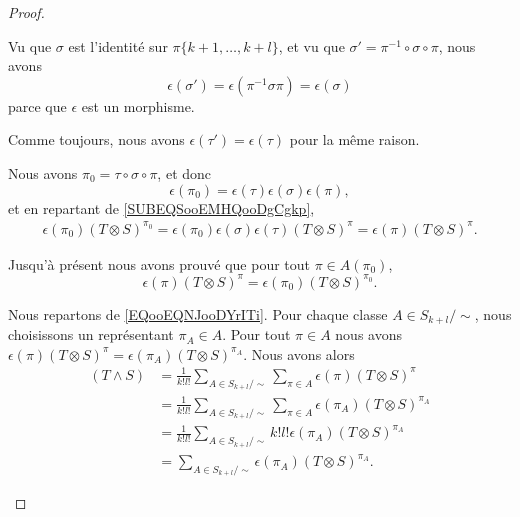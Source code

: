 \begin{proof}
\begin{subproof}
		\spitem[Signature]
		Vu que \( \sigma\) est l'identité sur \( \pi\{ k+1,\ldots,k+l \}\), et vu que \( \sigma'=\pi^{-1}\circ\sigma\circ\pi\), nous avons
		\begin{equation}
			\epsilon(\sigma')=\epsilon(\pi^{-1}\sigma\pi)=\epsilon(\sigma)
		\end{equation}
		parce que \( \epsilon\) est un morphisme.

		Comme toujours, nous avons \( \epsilon(\tau')=\epsilon(\tau)\) pour la même raison.

		Nous avons \( \pi_0=\tau\circ\sigma\circ\pi\), et donc
		\begin{equation}
			\epsilon(\pi_0)=\epsilon(\tau)\epsilon(\sigma)\epsilon(\pi),
		\end{equation}
		et en repartant de \eqref{SUBEQSooEMHQooDgCgkp},
		\begin{subequations}
			\begin{align}
				\epsilon(\pi_0)(T\otimes S)^{\pi_0}=\epsilon(\pi_0)\epsilon(\sigma)\epsilon(\tau)(T\otimes S)^{\pi}=\epsilon(\pi)(T\otimes S)^{\pi}.
			\end{align}
		\end{subequations}

		\spitem[Résumé]
		Jusqu'à présent nous avons prouvé que pour tout \( \pi\in A(\pi_0)\),
		\begin{equation}
			\epsilon(\pi)(T\otimes S)^{\pi}=\epsilon(\pi_0)(T\otimes S)^{\pi_0}.
		\end{equation}

		Nous repartons de \eqref{EQooEQNJooDYrITi}. Pour chaque classe \( A\in S_{k+l}/\sim\), nous choisissons un représentant \( \pi_A\in A\). Pour tout \( \pi\in A\) nous avons \( \epsilon(\pi)(T\otimes S)^{\pi}=\epsilon(\pi_A)(T\otimes S)^{\pi_A}\). Nous avons alors
		\begin{subequations}
			\begin{align}
				(T\wedge S) & =\frac{1}{ k!l!}\sum_{A\in S_{k+l}/\sim}\sum_{\pi\in A}\epsilon(\pi)(T\otimes S)^{\pi}      \\
				            & = \frac{1}{ k!l!}\sum_{A\in S_{k+l}/\sim}\sum_{\pi\in A}\epsilon(\pi_A)(T\otimes S)^{\pi_A} \\
				            & =\frac{1}{ k!l!}\sum_{A\in S_{k+l}/\sim}k!l!\epsilon(\pi_A)(T\otimes S)^{\pi_A}             \\
				            & =\sum_{A\in S_{k+l}/\sim}\epsilon(\pi_A)(T\otimes S)^{\pi_A}.
			\end{align}
		\end{subequations}


\end{subproof}
\end{proof}

